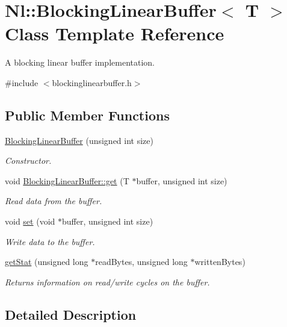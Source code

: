 \hypertarget{classNl_1_1BlockingLinearBuffer}{\section{Nl\-:\-:Blocking\-Linear\-Buffer$<$ T $>$ Class Template Reference}
\label{classNl_1_1BlockingLinearBuffer}
}


A blocking linear buffer implementation.  




{\ttfamily \#include $<$blockinglinearbuffer.\-h$>$}

\subsection*{Public Member Functions}
\begin{DoxyCompactItemize}
\item 
\hyperlink{group__Audio_gae6f35f45439b194a69587bd9c124a736}{Blocking\-Linear\-Buffer} (unsigned int size)
\begin{DoxyCompactList}\small\item\em Constructor. \end{DoxyCompactList}\item 
void \hyperlink{group__Audio_ga7fd45f57444309f03fab9a13644d2240}{Blocking\-Linear\-Buffer\-::get} (T $\ast$buffer, unsigned int size)
\begin{DoxyCompactList}\small\item\em Read data from the buffer. \end{DoxyCompactList}\item 
void \hyperlink{group__Audio_gacd7c49cb333fc991edae3247d2fb34ef}{set} (void $\ast$buffer, unsigned int size)
\begin{DoxyCompactList}\small\item\em Write data to the buffer. \end{DoxyCompactList}\item 
\hyperlink{group__Audio_gabdd2b325cd5a2383579737299b4b3aca}{get\-Stat} (unsigned long $\ast$read\-Bytes, unsigned long $\ast$written\-Bytes)
\begin{DoxyCompactList}\small\item\em Returns information on read/write cycles on the buffer. \end{DoxyCompactList}\end{DoxyCompactItemize}


\subsection{Detailed Description}
